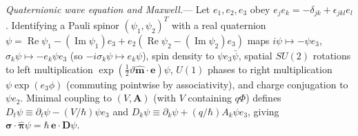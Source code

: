 \documentclass[aps,prl,reprint,superscriptaddress,nofootinbib,floatfix]{revtex4-2}
\theoremstyle{prlthm}
\newcommand{\prlsec}[1]{\par\smallskip\noindent\emph{#1.}---}
\begin{document}
\prlsec{Quaternionic wave equation and Maxwell}
Let $e_1,e_2,e_3$ obey $e_je_k=-\delta_{jk}+\epsilon_{jkl}e_l$. Identifying a Pauli spinor $(\psi_1,\psi_2)^T$ with a real quaternion $\psi=\operatorname{Re}\psi_1-(\operatorname{Im}\psi_1)e_3+\allowbreak e_2(\operatorname{Re}\psi_2-(\operatorname{Im}\psi_2)e_3)$ maps $i\psi\mapsto-\psi e_3$, $\sigma_k\psi\mapsto-e_k\psi e_3$ (so $-i\sigma_k\psi\mapsto e_k\psi$), spin density to $\psi e_3\bar{\psi}$, spatial $SU(2)$ rotations to left multiplication $\exp(\tfrac{1}{2}\vartheta\hat{\mathbf{m}}\cdot\mathbf{e})\psi$, $U(1)$ phases to right multiplication $\psi\exp(e_3\phi)$ (commuting pointwise by associativity), and charge conjugation to $\psi e_2$. Minimal coupling to $(V,\mathbf{A})$ (with $V$ containing $q\Phi$) defines $D_t\psi\equiv\partial_t\psi-(V/\hbar)\psi e_3$ and $D_k\psi\equiv\partial_k\psi+(q/\hbar)A_k\psi e_3$, giving $\boldsymbol{\sigma}\cdot\hat{\boldsymbol{\pi}}\psi=\hbar\,\mathbf{e}\cdot\mathbf{D}\psi$.
\end{document}
